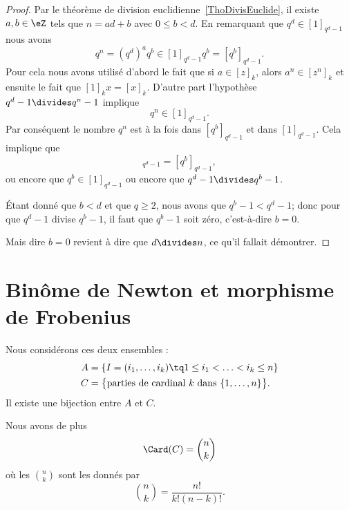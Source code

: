 \begin{proof}
	Par le théorème de division euclidienne~\ref{ThoDivisEuclide}, il existe \( a,b\in \eZ\) tels que \( n=ad+b\) avec \( 0\leq b<d\). En remarquant que \( q^d\in[1]_{q^d-1}\) nous avons
	\begin{equation}
		q^n=(q^d)^aq^b\in[1]_{q^d-1}q^b=[q^b]_{q^d-1}.
	\end{equation}
	Pour cela nous avons utilisé d'abord le fait que si \( a\in [z]_k\), alors \( a^n\in[z^n]_k\) et ensuite le fait que \( [1]_kx=[x]_k\). D'autre part l'hypothèse \( q^d-1\divides q^n-1\) implique
	\begin{equation}
		q^n\in[1]_{q^d-1}.
	\end{equation}
	Par conséquent le nombre \( q^n\) est à la fois dans \( [q^b]_{q^d-1}\) et dans \( [1]_{q^d-1}\). Cela implique que
	\begin{equation}
		[1]_{q^d-1}=[q^b]_{q^d-1},
	\end{equation}
	ou encore que \( q^b\in[1]_{q^d-1}\) ou encore que \( q^d-1\divides q^b-1\).

	Étant donné que \( b<d\) et que \( q\geq 2\), nous avons que \( q^b-1<q^d-1\); donc pour que \( q^d-1\) divise \( q^b-1\), il faut que \( q^b-1\) soit zéro, c'est-à-dire \( b=0\).

	Mais dire \( b=0\) revient à dire que \( d\divides n\), ce qu'il fallait démontrer.
\end{proof}

\section{Binôme de Newton et morphisme de Frobenius}


\begin{lemma}		\label{LEMooUTDTooXAmvdF}
	Nous considérons ces deux ensembles :
	\begin{subequations}
		\begin{align}
			A & =\{ I=(i_1,\ldots,i_k)\tq 1\leq i_1<\ldots <i_k\leq n \}                     \\
			C & =\big\{ \text{parties de cardinal \( k\) dans \( \{ 1,\ldots,n \}\)} \big\}.
		\end{align}
	\end{subequations}
	Il existe une bijection entre \( A\) et \( C\).

	Nous avons de plus
	\begin{equation}        \label{EQooSPVNooHoPnOe}
		\Card(C)={n\choose k}
	\end{equation}
	où les ${n\choose k}$ sont les  donnés par
	\begin{equation}
		{n\choose k} = \frac{ n! }{ k!(n-k)! }.
	\end{equation}
\end{lemma}


